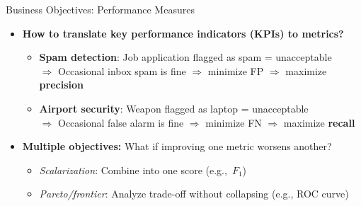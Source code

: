 \documentclass[10pt,compress,t,notes=noshow, xcolor=table]{beamer}
\begin{document}
\begin{frame}{Business Objectives: Performance Measures}
\label{kpi-metrics-slide}
\vspace{-0.5em}
\begin{itemize}
  \item<1-> \textbf{How to translate key performance indicators (KPIs) to metrics?}
\begin{itemize}
  \item \textbf{Spam detection}: Job application flagged as spam = unacceptable\\
      $\Rightarrow$ Occasional inbox spam is fine $\Rightarrow$ minimize FP $\Rightarrow$ maximize \textbf{precision}
  \item \textbf{Airport security}:  Weapon flagged as laptop = unacceptable\\
      $\Rightarrow$ Occasional false alarm is fine $\Rightarrow$ minimize FN $\Rightarrow$ maximize \textbf{recall}
\end{itemize}

  \item<2-> \textbf{Multiple objectives:} What if improving one metric worsens another?
    \begin{itemize}
      \item \textit{Scalarization}: Combine into one score (e.g.,\ $F_1$)
      \item \textit{Pareto/frontier}: Analyze trade-off without collapsing (e.g., ROC curve)
    \end{itemize}
\end{itemize}


\end{frame}
\end{document}
